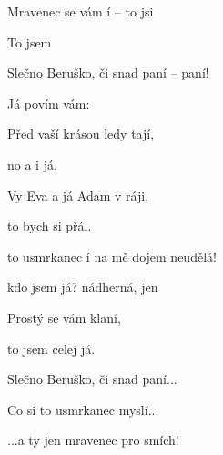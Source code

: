 

\zs
     Mravenec se vám í -- to jsi 

    To jsem 

    Slečno Beruško, či snad paní -- paní!

    Já povím vám:
\ks

\zs
    Před vaší krásou ledy tají,

    no a i já.

    Vy Eva a já Adam v ráji,

    to bych si přál.
\ks

\zr
     to usmrkanec í  na mě dojem neudělá!

     kdo jsem já?  nádherná,  jen 
\kr

\zs
    Prostý se vám klaní,

    to jsem celej já.

    Slečno Beruško, či snad paní...
\ks

\zr
    Co si to usmrkanec myslí...

    ...a ty jen mravenec pro smích!
\kr

\kp
